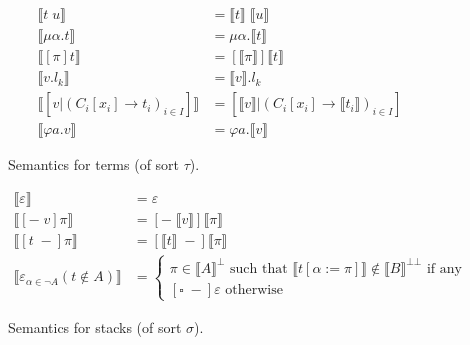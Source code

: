 \begin{figure}
  \begin{align*}
    \llbracket t\;u \rrbracket
      &= \llbracket t \rrbracket\; \llbracket u \rrbracket\\
    \llbracket \mu\alpha.t \rrbracket
      &= \mu \alpha.\llbracket t \rrbracket\\
    \llbracket [\pi]t \rrbracket
      &= [\llbracket \pi \rrbracket]\llbracket t \rrbracket\\
    \llbracket v.l_k \rrbracket
      &= \llbracket v \rrbracket.l_k\\
    \llbracket [v|(C_i[x_i] \to t_i)_{i \in I}] \rrbracket
      &= [\llbracket v \rrbracket | (C_i[x_i]
         \to \llbracket t_i \rrbracket)_{i \in I}]\\
    \llbracket \varphi a.v \rrbracket
      &= \varphi a.\llbracket v \rrbracket
  \end{align*}
  \caption{Semantics for terms (of sort $\tau$).}
  \label{semtau}
\end{figure}

\begin{figure}
  \begin{align*}
    \llbracket \varepsilon \rrbracket &= \varepsilon\\
    \llbracket [-\;v]\pi \rrbracket
      &= [-\;\llbracket v \rrbracket]\llbracket \pi \rrbracket\\
    \llbracket [t\;-]\pi \rrbracket
      &= [\llbracket t \rrbracket\;-]\llbracket \pi \rrbracket\\
    \llbracket \varepsilon_{\alpha \in \lnot A}(t \notin A) \rrbracket
      &= \begin{cases}
           \pi \in \llbracket A \rrbracket^\bot \text{ such that }
             \llbracket t[\alpha := \pi] \rrbracket \notin
             \llbracket B \rrbracket^{\bot\bot} \text{ if any}\\
           [\square\;-]\varepsilon \text { otherwise}
         \end{cases}
  \end{align*}
  \caption{Semantics for stacks (of sort $\sigma$).}
  \label{semsigma}
\end{figure}

